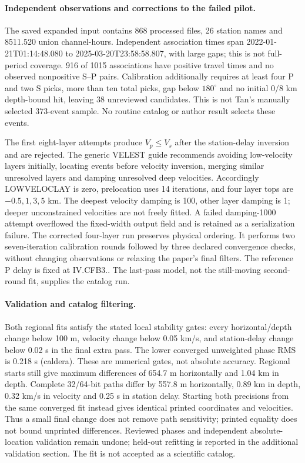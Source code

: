 \paragraph{Independent observations and corrections to the failed pilot.}
The saved expanded input contains 868 processed files, 26 station names and 8511.520 union channel-hours. Independent association times span 2022-01-21T01:14:48.080 to 2025-03-20T23:58:58.807, with large gaps; this is not full-period coverage. 916 of 1015 associations have positive travel times and no observed nonpositive S--P pairs. Calibration additionally requires at least four P and two S picks, more than ten total picks, gap below $180^\circ$ and no initial 0/8 km depth-bound hit, leaving 38 unreviewed candidates. This is not Tan's manually selected 373-event sample. No routine catalog or author result selects these events.

The first eight-layer attempts produce $V_p\leq V_s$ after the station-delay inversion and are rejected. The generic VELEST guide recommends avoiding low-velocity layers initially, locating events before velocity inversion, merging similar unresolved layers and damping unresolved deep velocities. Accordingly LOWVELOCLAY is zero, prelocation uses 14 iterations, and four layer tops are $-0.5,1,3,5$ km. The deepest velocity damping is 100, other layer damping is 1; deeper unconstrained velocities are not freely fitted. A failed damping-1000 attempt overflowed the fixed-width output field and is retained as a serialization failure. The corrected four-layer run preserves physical ordering. It performs two seven-iteration calibration rounds followed by three declared convergence checks, without changing observations or relaxing the paper's final filters. The reference P delay is fixed at IV.CFB3.. The last-pass model, not the still-moving second-round fit, supplies the catalog run.

\paragraph{Validation and catalog filtering.}
Both regional fits satisfy the stated local stability gates: every horizontal/depth change below 100 m, velocity change below 0.05 km/s, and station-delay change below 0.02 s in the final extra pass. The lower converged unweighted phase RMS is 0.218 s (caldera). These are numerical gates, not absolute accuracy. Regional starts still give maximum differences of 654.7 m horizontally and 1.04 km in depth. Complete 32/64-bit paths differ by 557.8 m horizontally, 0.89 km in depth, 0.32 km/s in velocity and 0.25 s in station delay. Starting both precisions from the same converged fit instead gives identical printed coordinates and velocities. Thus a small final change does not remove path sensitivity; printed equality does not bound unprinted differences. Reviewed phases and independent absolute-location validation remain undone; held-out refitting is reported in the additional validation section. The fit is not accepted as a scientific catalog.

